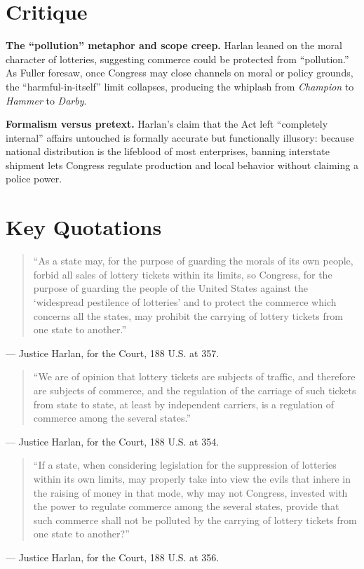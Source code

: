\documentclass[12pt]{article}
\begin{document}
\section{Critique}

\textbf{The ``pollution'' metaphor and scope creep.} Harlan leaned on the moral character of lotteries, suggesting commerce could be protected from ``pollution.'' As Fuller foresaw, once Congress may close channels on moral or policy grounds, the ``harmful-in-itself'' limit collapses, producing the whiplash from \textit{Champion} to \textit{Hammer} to \textit{Darby}.

\textbf{Formalism versus pretext.} Harlan's claim that the Act left ``completely internal'' affairs untouched is formally accurate but functionally illusory: because national distribution is the lifeblood of most enterprises, banning interstate shipment lets Congress regulate production and local behavior without claiming a police power.

\section{Key Quotations}

\begin{quote}
``As a state may, for the purpose of guarding the morals of its own people, forbid all sales of lottery tickets within its limits, so Congress, for the purpose of guarding the people of the United States against the `widespread pestilence of lotteries' and to protect the commerce which concerns all the states, may prohibit the carrying of lottery tickets from one state to another.''
\end{quote}
\noindent --- Justice Harlan, for the Court, 188 U.S. at 357.

\begin{quote}
``We are of opinion that lottery tickets are subjects of traffic, and therefore are subjects of commerce, and the regulation of the carriage of such tickets from state to state, at least by independent carriers, is a regulation of commerce among the several states.''
\end{quote}
\noindent --- Justice Harlan, for the Court, 188 U.S. at 354.

\begin{quote}
``If a state, when considering legislation for the suppression of lotteries within its own limits, may properly take into view the evils that inhere in the raising of money in that mode, why may not Congress, invested with the power to regulate commerce among the several states, provide that such commerce shall not be polluted by the carrying of lottery tickets from one state to another?''
\end{quote}
\noindent --- Justice Harlan, for the Court, 188 U.S. at 356.
\end{document}
